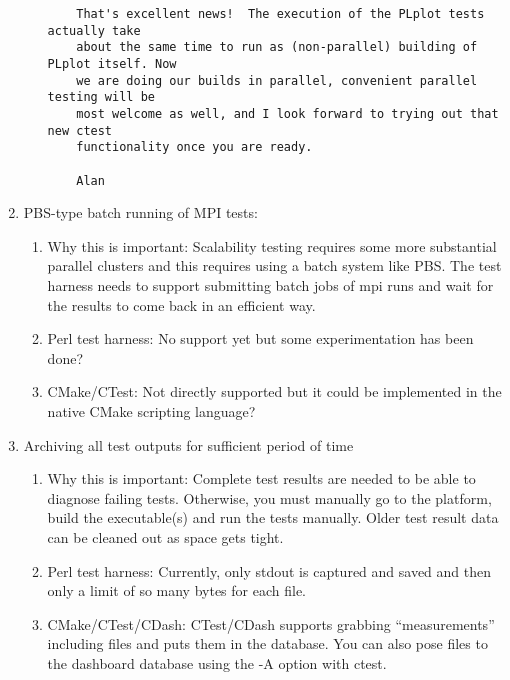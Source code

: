 \documentclass[pdf,ps2pdf,11pt]{SANDreport}
\begin{document}
\begin{enumerate}
\begin{enumerate}
{\begin{verbatim}
    That's excellent news!  The execution of the PLplot tests actually take
    about the same time to run as (non-parallel) building of PLplot itself. Now
    we are doing our builds in parallel, convenient parallel testing will be
    most welcome as well, and I look forward to trying out that new ctest
    functionality once you are ready.
    
    Alan
    \end{verbatim}}

  \end{enumerate}

{}\item PBS-type batch running of MPI tests:

  \begin{enumerate}

  {}\item Why this is important: Scalability testing requires some
  more substantial parallel clusters and this requires using a batch
  system like PBS.  The test harness needs to support submitting
  batch jobs of mpi runs and wait for the results to come back in an
  efficient way.

  {}\item Perl test harness: No support yet but some experimentation
  has been done?

  {}\item CMake/CTest: Not directly supported but it could be
  implemented in the native CMake scripting language?

  \end{enumerate}

{}\item Archiving all test outputs for sufficient period of time

  \begin{enumerate}

  {}\item Why this is important: Complete test results are needed to
  be able to diagnose failing tests.  Otherwise, you must manually
  go to the platform, build the executable(s) and run the tests
  manually.  Older test result data can be cleaned out as space gets
  tight.

  {}\item Perl test harness: Currently, only stdout is captured and
  saved and then only a limit of so many bytes for each file.

  {}\item CMake/CTest/CDash: CTest/CDash supports grabbing
  ``measurements'' including files and puts them in the database.  You
  can also pose files to the dashboard database using the -A option
  with ctest.


\end{enumerate}
\end{enumerate}
\end{document}

